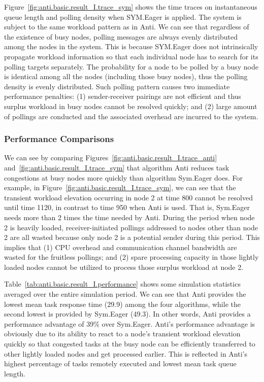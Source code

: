 Figure~\ref{fig:anti.basic.result_I.trace_sym} shows the time traces on instantaneous queue length
and polling density when {\sc SYM.Eager} is applied. 
The system is subject to the same workload pattern as in {\sc Anti}. 
We can see that regardless of the existence of busy nodes,
polling messages are always evenly distributed among the nodes in the system.
This is because {\sc SYM.Eager} does not intrinsically
propagate workload information 
so that each individual node has to search for
its polling targets separately. 
The probability for a node to be polled by a busy node
is identical among all the nodes (including those busy nodes),
thus the polling density is evenly distributed.
Such polling pattern causes two immediate performance penalties:
(1) sender-receiver pairings are not efficient and thus
surplus workload in busy nodes cannot be resolved quickly; and
(2) large amount of pollings are conducted and 
the associated overhead are incurred to the system.


\subsubsection {Performance Comparisons}

We can see by comparing Figures~\ref{fig:anti.basic.result_I.trace_anti} 
and~\ref{fig:anti.basic.result_I.trace_sym} that algorithm {\sc Anti}
reduces task congestions at busy nodes more 
quickly than algorithm {\sc Sym.Eager} does.
For example, in Figure~\ref{fig:anti.basic.result_I.trace_sym}, 
we can see that the 
transient workload elevation occurring in node 2 at time 800 
cannot be resolved until time 1120, in contrast to time 950 
when {\sc Anti} is used.
That is, {\sc Sym.Eager} needs more than 2 times the time needed by {\sc Anti}.
During the period when node 2 is heavily loaded,
receiver-initiated pollings addressed to nodes 
other than node 2 are all wasted because only node 2
is a potential sender during this period.
This implies that
(1) CPU overhead and communication channel bandwidth
are wasted for the fruitless pollings; and
(2) spare processing capacity in those lightly loaded nodes cannot be
utilized to process those surplus workload at node 2.
	


Table~\ref{tab:anti.basic.result_I.performance} 
shows some simulation statistics averaged
over the entire simulation period.
We can see that {\sc Anti} provides the lowest 
mean task response time (29.9) among the four algorithms, 
while the second lowest is provided by {\sc Sym.Eager} (49.3).
In other words, {\sc Anti} provides a performance advantage of 39\%
over {\sc Sym.Eager}.
{\sc Anti}'s performance advantage is obviously due 
to its ability to react to a node's transient workload elevation 
quickly so that congested tasks at the busy node can be efficiently
transferred to other lightly loaded nodes and get processed earlier.
This is reflected in {\sc Anti}'s highest percentage of
tasks remotely executed and lowest mean task queue length.

